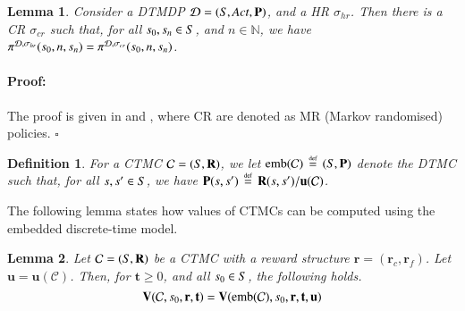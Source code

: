 \documentclass[10pt,twocolumn]{article}
\newenvironment{proof}{\paragraph{Proof:}}{\hfill$\square$}
\newtheorem{definition}{Definition}
\newtheorem{lemma}{Lemma}
\newcommand{\states} {{\ensuremath S}}
\newcommand{\state}  {{\ensuremath s}}
\newcommand{\nats}    {{\ensuremath {\mathbb{N}}}}
\newcommand{\acts}{\mathit{Act}}
\newcommand{\pmat}{\mathbf{P}}
\newcommand{\rmat}{\mathbf{R}}
\newcommand{\dmodel}{\mathcal{D}}
\newcommand{\cmodel}{\mathcal{C}}
\newcommand{\urate}{\mathbf{u}}
\newcommand{\schedhr}{{\sigma_\mathit{hr}}}
\newcommand{\schedcr}{{\sigma_\mathit{cr}}}
\newcommand{\rew}{\mathbf{r}}
\newcommand{\frew}{\mathbf{r}_f}
\newcommand{\crew}{\mathbf{r}_c}
\newcommand{\timeb}{\mathbf{t}}
\newcommand{\mvalue}{\mathbf{V}}
\newcommand{\emb}{\mathrm{emb}}
\newcommand{\defeq}{\,\stackrel{\mbox{\rm {\tiny def}}}{=}\,}
\newcommand{\tprob}{\pi}
\begin{document}
\begin{lemma}
  \label{lem:cr-suffices-dt}
Consider a DTMDP $\dmodel = (\states, \acts, \pmat)$, and a HR $\schedhr$.
  Then there is a CR $\schedcr$ such that, for all $\state_0, \state_n \in \states$, and $n \in \nats$,
  we have $\tprob^{\dmodel,\schedhr}(\state_0, n, \state_n) = \tprob^{\dmodel,{\schedcr}}(\state_0, n, \state_n)$.
\end{lemma}
\begin{proof}
The proof is given in \cite{Strauch66} and \cite[Theorem 5.5.1]{Puterman94}, where CR are denoted as MR (Markov randomised) policies.
\end{proof}

\begin{definition}
  For a CTMC $\cmodel = (\states, \rmat)$, we let $\emb(\cmodel) \defeq (\states, \pmat)$ denote the DTMC
  such that, for all $\state, \state' \in \states$, we have $\pmat(\state, \state') \defeq \rmat(\state, \state')/\urate(\cmodel)$.
\end{definition}

The following lemma states how values of CTMCs can be computed using the embedded discrete-time model.
\begin{lemma}
  \label{lem:disc-rew}
Let $\cmodel = (\states, \rmat)$ be a CTMC with a reward structure $\rew = (\crew, \frew)$.
  Let $\urate = \urate(\cmodel)$.
  Then, for $\timeb \geq 0$, and all $\state_0 \in \states$, the following holds.
  \begin{equation*}
    \mvalue(\cmodel, \state_0, \rew, \timeb) = \mvalue(\emb(\cmodel), \state_0, \rew, \timeb, \urate)
  \end{equation*}
\end{lemma}
\end{document}
